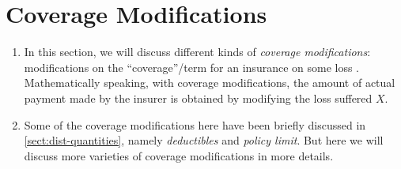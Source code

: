 \section{Coverage Modifications}
\label{sect:coverage-mod}
\begin{enumerate}
\item In this section, we will discuss different kinds of \emph{coverage
modifications}: modifications on the ``coverage''/term for an insurance on some
loss . Mathematically speaking, with coverage modifications,
the amount of actual payment  made by the insurer
 is obtained by modifying the loss suffered \(X\).

\item Some of the coverage modifications here have been briefly discussed in
\cref{sect:dist-quantities}, namely \emph{deductibles} and \emph{policy limit}.
But here we will discuss more varieties of coverage modifications in more
details.
\end{enumerate}
